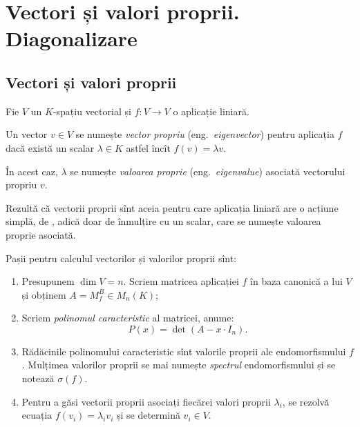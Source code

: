 \chapter{Vectori și valori proprii. Diagonalizare}

\section{Vectori și valori proprii}

Fie $ V $ un $ K $-spațiu vectorial și $ f : V \to V $ o aplicație
liniară.
\begin{definition}\label{def:vvp} 
  Un vector $ v \in V $ se numește \emph{vector propriu} (eng.\ \emph{eigenvector})
  pentru aplicația $ f $ dacă există un scalar $ \lambda \in K $ astfel încît
  $ f(v) = \lambda v $.

  În acest caz, $ \lambda $ se numește \emph{valoarea proprie} (eng.\ \emph{eigenvalue})
  asociată vectorului propriu $ v $.
\end{definition}

Rezultă că vectorii proprii sînt aceia pentru care aplicația liniară
are o acțiune simplă, de , adică doar de înmulțire cu un scalar,
care se numește valoarea proprie asociată.

Pașii pentru calculul vectorilor și valorilor proprii sînt:
\begin{enumerate}[(1)]
\item Presupunem $ \dim V = n $. Scriem matricea aplicației $ f $ în baza
  canonică a lui $ V $ și obținem $ A = M_f^B \in M_n(K) $;
\item Scriem \emph{polinomul caracteristic} al matricei, anume:
  \[
    P(x) = \det(A - x \cdot I_n).
  \]
\item Rădăcinile polinomului caracteristic sînt valorile proprii ale
  endomorfismului $ f $. Mulțimea valorilor proprii se mai numește \emph{spectrul}
  endomorfismului și se notează $ \sigma(f) $. 
\item Pentru a găsi vectorii proprii asociați fiecărei valori proprii $ \lambda_i $,
  se rezolvă ecuația $ f(v_i) = \lambda_i v_i $ și se determină $ v_i \in V $.
\end{enumerate}


